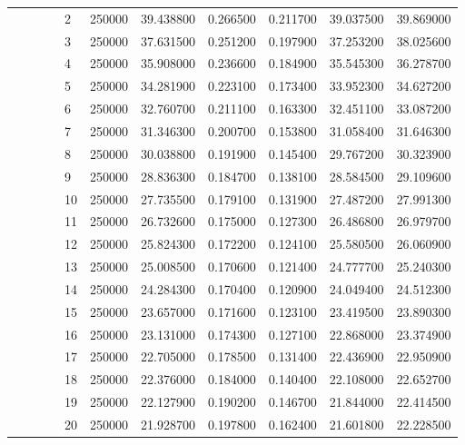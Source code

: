 \begin{tabular}{llllllrrrrr}
\cline{5-11}
 &  &  &  & 2 & 250000 & 39.438800 & 0.266500 & 0.211700 & 39.037500 & 39.869000 \\
\cline{5-11}
 &  &  &  & 3 & 250000 & 37.631500 & 0.251200 & 0.197900 & 37.253200 & 38.025600 \\
\cline{5-11}
 &  &  &  & 4 & 250000 & 35.908000 & 0.236600 & 0.184900 & 35.545300 & 36.278700 \\
\cline{5-11}
 &  &  &  & 5 & 250000 & 34.281900 & 0.223100 & 0.173400 & 33.952300 & 34.627200 \\
\cline{5-11}
 &  &  &  & 6 & 250000 & 32.760700 & 0.211100 & 0.163300 & 32.451100 & 33.087200 \\
\cline{5-11}
 &  &  &  & 7 & 250000 & 31.346300 & 0.200700 & 0.153800 & 31.058400 & 31.646300 \\
\cline{5-11}
 &  &  &  & 8 & 250000 & 30.038800 & 0.191900 & 0.145400 & 29.767200 & 30.323900 \\
\cline{5-11}
 &  &  &  & 9 & 250000 & 28.836300 & 0.184700 & 0.138100 & 28.584500 & 29.109600 \\
\cline{5-11}
 &  &  &  & 10 & 250000 & 27.735500 & 0.179100 & 0.131900 & 27.487200 & 27.991300 \\
\cline{5-11}
 &  &  &  & 11 & 250000 & 26.732600 & 0.175000 & 0.127300 & 26.486800 & 26.979700 \\
\cline{5-11}
 &  &  &  & 12 & 250000 & 25.824300 & 0.172200 & 0.124100 & 25.580500 & 26.060900 \\
\cline{5-11}
 &  &  &  & 13 & 250000 & 25.008500 & 0.170600 & 0.121400 & 24.777700 & 25.240300 \\
\cline{5-11}
 &  &  &  & 14 & 250000 & 24.284300 & 0.170400 & 0.120900 & 24.049400 & 24.512300 \\
\cline{5-11}
 &  &  &  & 15 & 250000 & 23.657000 & 0.171600 & 0.123100 & 23.419500 & 23.890300 \\
\cline{5-11}
 &  &  &  & 16 & 250000 & 23.131000 & 0.174300 & 0.127100 & 22.868000 & 23.374900 \\
\cline{5-11}
 &  &  &  & 17 & 250000 & 22.705000 & 0.178500 & 0.131400 & 22.436900 & 22.950900 \\
\cline{5-11}
 &  &  &  & 18 & 250000 & 22.376000 & 0.184000 & 0.140400 & 22.108000 & 22.652700 \\
\cline{5-11}
 &  &  &  & 19 & 250000 & 22.127900 & 0.190200 & 0.146700 & 21.844000 & 22.414500 \\
\cline{5-11}
 &  &  &  & 20 & 250000 & 21.928700 & 0.197800 & 0.162400 & 21.601800 & 22.228500 \\

\end{tabular}
